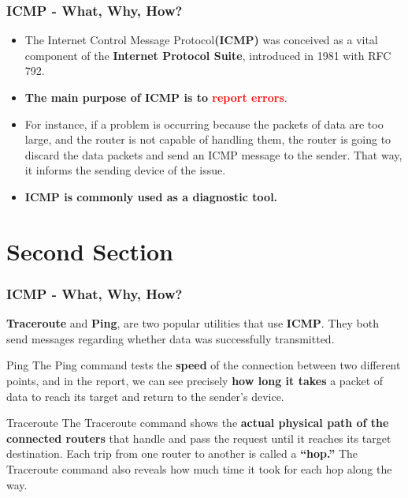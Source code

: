\documentclass[aspectratio=169]{beamer}
\begin{document}
\begin{frame}
\frametitle{ICMP - What, Why, How?}
\begin{itemize}
    \item The Internet Control Message Protocol\textbf{(ICMP)} was conceived as a vital component of the \textbf{Internet Protocol Suite}, introduced in 1981 with RFC 792.
    \item \textbf{The main purpose of ICMP is to \textcolor{red}{report errors}}. 
    \item For instance, if a problem is occurring because the packets of data are too large, and the router is not capable of handling them, the router is going to discard the data packets and send an ICMP message to the sender. That way, it informs the sending device of the issue.
    \item \textbf{ICMP is commonly used as a diagnostic tool.}
\end{itemize}

\end{frame}


\section{Second Section} 

\begin{frame}
\frametitle{ICMP - What, Why, How?}
\textbf{Traceroute} and \textbf{Ping}, are two popular utilities that use \textbf{ICMP}. They both send messages regarding whether data was successfully transmitted.
\begin{block}{Ping}
The Ping command tests the \textbf{speed} of the connection between two different points, and in the report, we can see precisely \textbf{how long it takes} a packet of data to reach its target and return to the sender’s device.
\end{block}

\begin{block}{Traceroute}
The Traceroute command shows the \textbf{actual physical path of the connected routers} that handle and pass the request until it reaches its target destination. Each trip from one router to another is called a \textbf{“hop.”} The Traceroute command also reveals how much time it took for each hop along the way. 
\end{block}

\end{frame}
\end{document}
